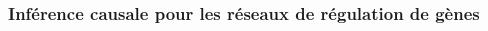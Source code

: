 \documentclass[11pt,xcolor=dvipsnames]{beamer}
\begin{document}
\begin{frame}
\frametitle{Inférence causale pour les réseaux de régulation de gènes}
\begin{overlayarea}{12cm}{5.5cm}
\vspace{-0.5em}
\begin{figure}
\centering
{}
\end{figure}
\end{overlayarea}


\end{frame}
\end{document}
